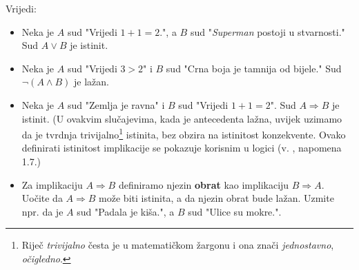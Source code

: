 \begin{exmp} Vrijedi:
\label{16}
\begin{itemize}
\item Neka je \(A\) sud "Vrijedi \(1+1=2\).", a \(B\) sud "\textit{Superman} postoji u stvarnosti." Sud \(A\vee B\) je istinit.
\item Neka je \(A\) sud "Vrijedi \(3>2\)" i \(B\) sud "Crna boja je tamnija od bijele." Sud \(\neg(A\wedge B)\) je lažan.
\item Neka je \(A\) sud "Zemlja je ravna" i \(B\) sud "Vrijedi \(1+1=2\)". Sud \(A\Rightarrow B\) je istinit. (U ovakvim slučajevima, kada je antecedenta lažna, uvijek uzimamo da je tvrdnja trivijalno\footnote{Riječ \textit{trivijalno} česta je u matematičkom žargonu i ona znači \textit{jednostavno}, \textit{očigledno}.} istinita, bez obzira na istinitost konzekvente. Ovako definirati istinitost implikacije se pokazuje korisnim u logici (v. \cite{1}, napomena 1.7.)
\item Za implikaciju \(A\Rightarrow B\) definiramo njezin \textbf{obrat} kao implikaciju \(B\Rightarrow A\). Uočite da \(A\Rightarrow B\) može biti istinita, a da njezin obrat bude lažan. Uzmite npr. da je \(A\) sud "Padala je kiša.", a \(B\) sud "Ulice su mokre.".
\end{itemize}
\end{exmp}

